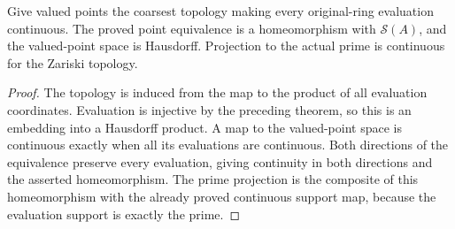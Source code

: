 \begin{theorem}
\label{spectrum:valued-point-topology}
\leanok
{}
Give valued points the coarsest topology making every original-ring
evaluation continuous. The proved point equivalence is a homeomorphism
with $\mathcal S(A)$, and the valued-point space is Hausdorff. Projection
to the actual prime is continuous for the Zariski topology.
\end{theorem}
\begin{proof}
The topology is induced from the map to the product of all evaluation
coordinates. Evaluation is injective by the preceding theorem, so this
is an embedding into a Hausdorff product. A map to the valued-point
space is continuous exactly when all its evaluations are continuous.
Both directions of the equivalence preserve every evaluation, giving
continuity in both directions and the asserted homeomorphism. The prime
projection is the composite of this homeomorphism with the already proved
continuous support map, because the evaluation support is exactly the prime.
\end{proof}

